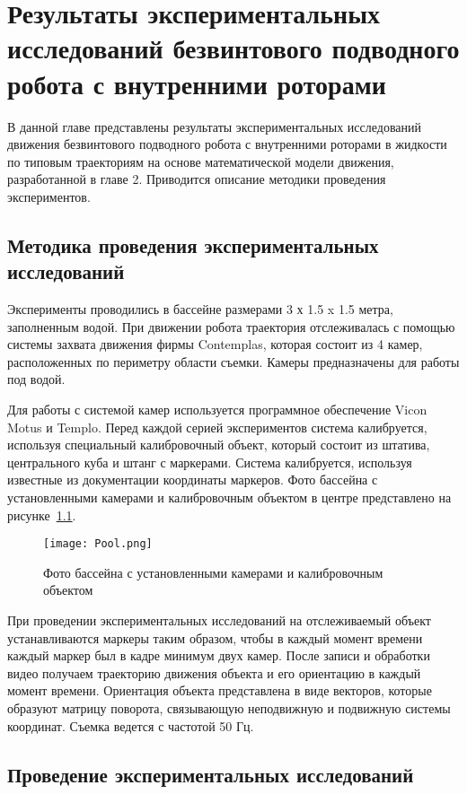\chapter{Результаты экспериментальных исследований безвинтового подводного робота с внутренними роторами}\label{ch:ch4}

В данной главе представлены результаты экспериментальных исследований движения безвинтового подводного робота с внутренними роторами в жидкости по типовым траекториям на основе математической модели движения, разработанной в главе 2. Приводится описание методики проведения экспериментов.

\section{Методика проведения экспериментальных исследований}\label{sec:ch4/sec1}

Эксперименты проводились в бассейне размерами 3 х 1.5 x 1.5 метра, заполненным водой. При движении робота траектория отслеживалась с помощью системы захвата движения фирмы Contemplas, которая состоит из 4 камер, расположенных по периметру области съемки. Камеры предназначены для работы под водой. 

Для работы с системой камер используется программное обеспечение Vicon Motus и Templo. Перед каждой серией экспериментов система калибруется, используя специальный калибровочный объект, который состоит из штатива, центрального куба и штанг с маркерами. Система калибруется, используя известные из документации координаты маркеров. Фото бассейна с установленными камерами и калибровочным объектом в центре представлено на рисунке~\ref{Pool}.

\begin{figure}[h]
	\centering
	\texttt{[image: Pool.png]}%
	\caption{Фото бассейна с установленными камерами и калибровочным объектом}
	\label{Pool}
\end{figure}

При проведении экспериментальных исследований на отслеживаемый объект устанавливаются маркеры таким образом, чтобы в каждый момент времени каждый маркер был в кадре минимум двух камер. После записи и обработки видео получаем траекторию движения объекта и его ориентацию в каждый момент времени. Ориентация объекта представлена в виде векторов, которые образуют матрицу поворота, связывающую неподвижную и подвижную системы координат. Съемка ведется с частотой 50 Гц.

\section{Проведение экспериментальных исследований}\label{subsec:ch4/sec2/sub1}

